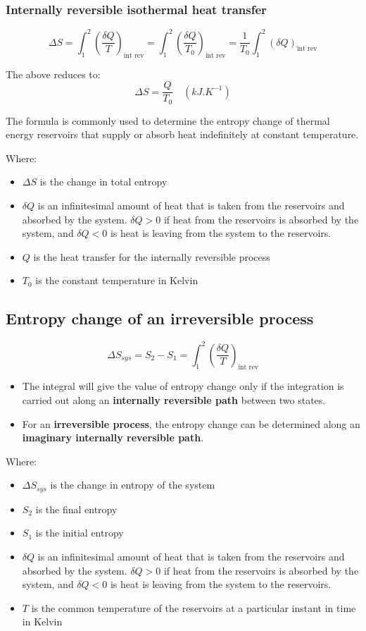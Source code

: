 \documentclass[11pt]{article}
\begin{document}
 \newpage
\subsubsection{Internally reversible isothermal heat transfer}
\label{sec:org28309ed}
\[\Delta S = \int_1^2 \left(\frac{\delta Q}{T} \right)_{\text{int rev}} = \int_1^2 \left(\frac{\delta Q}{T_0} \right)_{\text{int rev}} = \frac{1}{T_0} \int_1^2 (\delta Q)_{\text{int rev}}\]

The above reduces to:
\[\Delta S = \frac{Q}{T_0} \quad (\unit{kJ.K^{-1}})\]

The formula is commonly used to determine the entropy change of thermal energy reservoirs that supply or absorb heat indefinitely at constant temperature.


Where:
\begin{itemize}
\item \(\Delta S\) is the change in total entropy
\item \(\delta Q\) is an infinitesimal amount of heat that is taken from the reservoirs and absorbed by the system. \(\delta Q > 0\) if heat from the reservoirs is absorbed by the system, and \(\delta Q < 0\) is heat is leaving from the system to the reservoirs.
\item \(Q\) is the heat transfer for the internally reversible process
\item \(T_0\) is the constant temperature in Kelvin
\end{itemize}

 \newpage
\subsection{Entropy change of an irreversible process}
\label{sec:org5d01631}
\[\Delta S_{sys} = S_2 - S_1 = \int_1^2 \left(\frac{\delta Q}{T} \right)_{\text{int rev}}\]

\begin{itemize}
\item The integral will give the value of entropy change only if the integration is carried out along an \textbf{internally reversible path} between two states.
\item For an \textbf{irreversible process}, the entropy change can be determined along an \textbf{imaginary internally reversible path}.
\end{itemize}

Where:
\begin{itemize}
\item \(\Delta S_{sys}\) is the change in entropy of the system
\item \(S_2\) is the final entropy
\item \(S_1\) is the initial entropy
\item \(\delta Q\) is an infinitesimal amount of heat that is taken from the reservoirs and absorbed by the system. \(\delta Q > 0\) if heat from the reservoirs is absorbed by the system, and \(\delta Q < 0\) is heat is leaving from the system to the reservoirs.
\item \(T\) is the common temperature of the reservoirs at a particular instant in time in Kelvin
\end{itemize}
\end{document}
